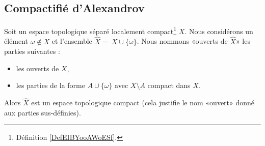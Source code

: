 \subsection{Compactifié d'Alexandrov}

\begin{propositionDef}       \label{PROPooHNOZooPSzKIN}
	Soit un espace topologique séparé localement compact\footnote{Définition \ref{DefEIBYooAWoESf}.} \( X\). Nous considérons un élément \( \omega\notin X\) et l'ensemble \( \hat X =\ X\cup\{ \omega \}\). Nous nommons «ouverts de \( \hat X\)» les parties suivantes :
	\begin{itemize}
		\item les ouverts de \( X\),
		\item les parties de la forme \( A\cup\{ \omega \}\) avec \( X\setminus A\) compact dans \( X\).
	\end{itemize}
	Alors \( \hat X\) est un espace topologique compact (cela justifie le nom «ouvert» donné aux parties sus-définies).
\end{propositionDef}

